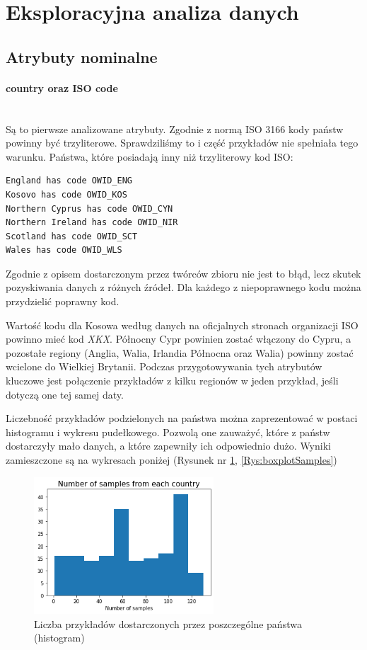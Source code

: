 \documentclass[12pt, oneside]{article}
\begin{document}
\section{Eksploracyjna analiza danych}


\subsection{Atrybuty nominalne}

\paragraph{country oraz ISO code}
\mbox{}\\
Są to pierwsze analizowane atrybuty. Zgodnie z normą ISO 3166 kody państw powinny być trzyliterowe. Sprawdziliśmy to i część przykładów nie spełniała tego warunku. Państwa, które posiadają inny niż trzyliterowy kod ISO:
\begin{verbatim}
England has code OWID_ENG
Kosovo has code OWID_KOS
Northern Cyprus has code OWID_CYN
Northern Ireland has code OWID_NIR
Scotland has code OWID_SCT
Wales has code OWID_WLS
\end{verbatim}
Zgodnie z opisem dostarczonym przez twórców zbioru nie jest to błąd, lecz skutek pozyskiwania danych z różnych źródeł. Dla każdego z niepoprawnego kodu można przydzielić poprawny kod.

Wartość kodu dla Kosowa według danych na oficjalnych stronach organizacji ISO powinno mieć kod \textit{XKX}. Północny Cypr powinien zostać włączony do Cypru, a pozostałe regiony (Anglia, Walia, Irlandia Północna oraz Walia) powinny zostać wcielone do  Wielkiej Brytanii. Podczas przygotowywania tych atrybutów kluczowe jest połączenie przykładów z kilku regionów w jeden przykład, jeśli dotyczą one tej samej daty. 


Liczebność przykładów podzielonych na państwa można zaprezentować w postaci histogramu i wykresu pudełkowego. Pozwolą one zauważyć, które z państw dostarczyły mało danych, a które zapewniły ich odpowiednio dużo. Wyniki zamieszczone są na wykresach poniżej (Rysunek nr \ref{Rys:histogramSamples}, \ref{Rys:boxplotSamples})

\begin{figure}[h]
\centering
\includegraphics[width=0.6\textwidth]{../img/number_of_samples.png} 
\caption{Liczba przykładów dostarczonych przez poszczególne państwa (histogram)}
\label{Rys:histogramSamples}
\end{figure}
\end{document}
